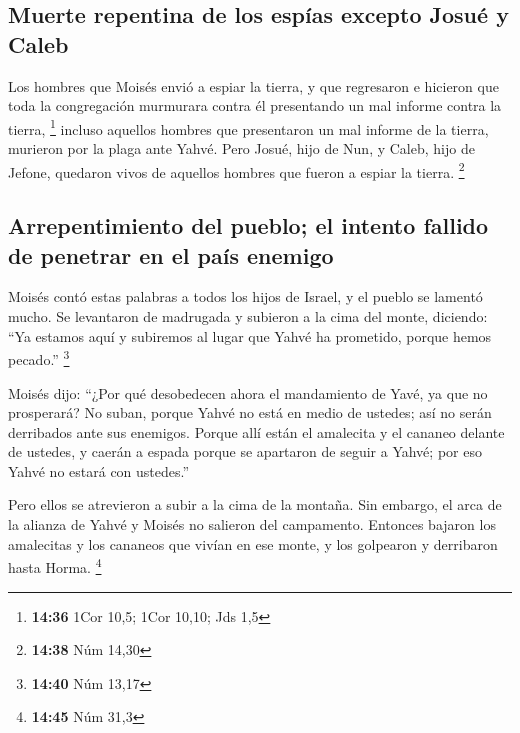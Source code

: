 \begin{paracol}{2}
\hypertarget{muerte-repentina-de-los-espuxedas-excepto-josuuxe9-y-caleb}{%
\subsection{Muerte repentina de los espías excepto Josué y
Caleb}\label{muerte-repentina-de-los-espuxedas-excepto-josuuxe9-y-caleb}}

 Los hombres que Moisés envió a espiar la tierra, y que
regresaron e hicieron que toda la congregación murmurara contra él
presentando un mal informe contra la tierra, \footnote{\textbf{14:36}
  1Cor 10,5; 1Cor 10,10; Jds 1,5}  incluso aquellos
hombres que presentaron un mal informe de la tierra, murieron por la
plaga ante Yahvé.  Pero Josué, hijo de Nun, y Caleb, hijo
de Jefone, quedaron vivos de aquellos hombres que fueron a espiar la
tierra. \footnote{\textbf{14:38} Núm 14,30}

\hypertarget{arrepentimiento-del-pueblo-el-intento-fallido-de-penetrar-en-el-pauxeds-enemigo}{%
\subsection{Arrepentimiento del pueblo; el intento fallido de penetrar
en el país
enemigo}\label{arrepentimiento-del-pueblo-el-intento-fallido-de-penetrar-en-el-pauxeds-enemigo}}

 Moisés contó estas palabras a todos los hijos de Israel,
y el pueblo se lamentó mucho.  Se levantaron de madrugada
y subieron a la cima del monte, diciendo: ``Ya estamos aquí y subiremos
al lugar que Yahvé ha prometido, porque hemos pecado.'' \footnote{\textbf{14:40}
  Núm 13,17}

 Moisés dijo: ``¿Por qué desobedecen ahora el mandamiento
de Yavé, ya que no prosperará?  No suban, porque Yahvé no
está en medio de ustedes; así no serán derribados ante sus enemigos.
 Porque allí están el amalecita y el cananeo delante de
ustedes, y caerán a espada porque se apartaron de seguir a Yahvé; por
eso Yahvé no estará con ustedes.''

 Pero ellos se atrevieron a subir a la cima de la
montaña. Sin embargo, el arca de la alianza de Yahvé y Moisés no
salieron del campamento.  Entonces bajaron los amalecitas
y los cananeos que vivían en ese monte, y los golpearon y derribaron
hasta Horma. \footnote{\textbf{14:45} Núm 31,3}


\end{paracol}
